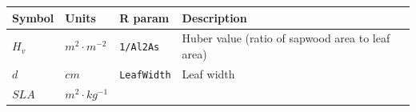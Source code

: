\documentclass[]{book}
\begin{document}
\begin{longtable}[]{@{}llll@{}}
\toprule
\begin{minipage}[b]{0.11\columnwidth}\raggedright\strut
Symbol\strut
\end{minipage} & \begin{minipage}[b]{0.10\columnwidth}\raggedright\strut
Units\strut
\end{minipage} & \begin{minipage}[b]{0.12\columnwidth}\raggedright\strut
R param\strut
\end{minipage} & \begin{minipage}[b]{0.45\columnwidth}\raggedright\strut
Description\strut
\end{minipage}\tabularnewline
\midrule
\endhead
\begin{minipage}[t]{0.11\columnwidth}\raggedright\strut
\(H_v\)\strut
\end{minipage} & \begin{minipage}[t]{0.10\columnwidth}\raggedright\strut
\(m^2 \cdot m^{-2}\)\strut
\end{minipage} & \begin{minipage}[t]{0.12\columnwidth}\raggedright\strut
\texttt{1/Al2As}\strut
\end{minipage} & \begin{minipage}[t]{0.45\columnwidth}\raggedright\strut
Huber value (ratio of sapwood area to leaf area)\strut
\end{minipage}\tabularnewline
\begin{minipage}[t]{0.11\columnwidth}\raggedright\strut
\(d\)\strut
\end{minipage} & \begin{minipage}[t]{0.10\columnwidth}\raggedright\strut
\(cm\)\strut
\end{minipage} & \begin{minipage}[t]{0.12\columnwidth}\raggedright\strut
\texttt{LeafWidth}\strut
\end{minipage} & \begin{minipage}[t]{0.45\columnwidth}\raggedright\strut
Leaf width\strut
\end{minipage}\tabularnewline
\begin{minipage}[t]{0.11\columnwidth}\raggedright\strut
\(SLA\)\strut
\end{minipage} & \begin{minipage}[t]{0.10\columnwidth}\raggedright\strut
\(m^2 \cdot kg^{-1}\)\strut
\end{minipage} & \begin{minipage}[t]{0.12\columnwidth}\raggedright\strut

\end{minipage}
\end{longtable}
\end{document}
